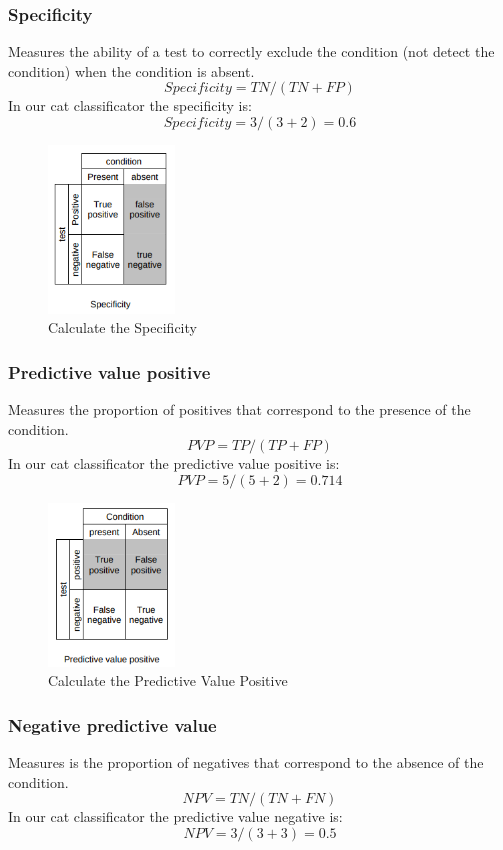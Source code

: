 \subsubsection[Specificity]{Specificity}
Measures the ability of a test to correctly exclude the condition (not detect the condition) when the condition is absent.
\[ Specificity  = TN/(TN+FP) \]
In our cat classificator the specificity is:
\[ Specificity = 3/(3+2) = 0.6 \]

\begin{figure}[H]
\centering
\includegraphics[width=0.3\textwidth]{./figures/Specificity}
\caption{Calculate the Specificity}
\end{figure}

\subsubsection[Predictive value positive]{Predictive value positive}
Measures the proportion of positives that correspond to the presence of the condition.
\[ PVP  =  TP/(TP+FP) \]
In our cat classificator the predictive value positive is:
\[ PVP = 5/(5+2) = 0.714 \]

\begin{figure}[H]
\centering
\includegraphics[width=0.3\textwidth]{./figures/PredictiveValuePositive}
\caption{Calculate the Predictive Value Positive}
\end{figure}


\subsubsection[Negative predictive value]{Negative predictive value}
Measures is the proportion of negatives that correspond to the absence of the condition. 
\[ NPV =  TN/(TN+FN) \]
In our cat classificator the predictive value negative is:
\[ NPV = 3/(3+3) = 0.5 \]

